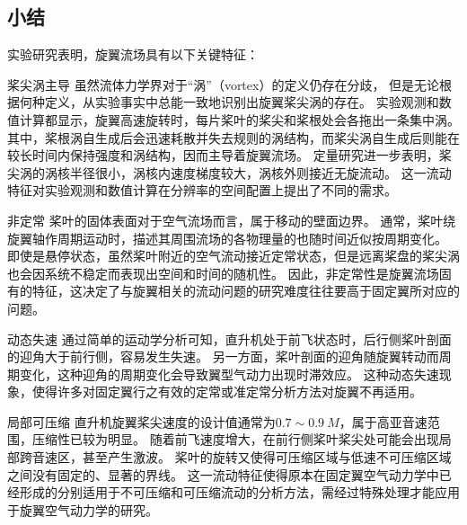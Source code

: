 \documentclass[doctor,openright,twoside,color]{buaathesis}
\begin{document}
\subsection{小结}
实验研究表明，旋翼流场具有以下关键特征：
\begin{compactdesc}
  \item[桨尖涡主导]
  虽然流体力学界对于“涡”（vortex）的定义仍存在分歧，%
  但是无论根据何种定义，从实验事实中总能一致地识别出旋翼桨尖涡的存在。
  实验观测和数值计算都显示，旋翼高速旋转时，每片桨叶的桨尖和桨根处会各拖出一条集中涡。
  其中，桨根涡自生成后会迅速耗散并失去规则的涡结构，而桨尖涡自生成后则能在较长时间内保持强度和涡结构，因而主导着旋翼流场。
  定量研究进一步表明，桨尖涡的涡核半径很小，涡核内速度梯度较大，涡核外则接近无旋流动。
  这一流动特征对实验观测和数值计算在分辨率的空间配置上提出了不同的需求。
  \item[非定常]
  桨叶的固体表面对于空气流场而言，属于移动的壁面边界。
  通常，桨叶绕旋翼轴作周期运动时，描述其周围流场的各物理量的也随时间近似按周期变化。
  即使是悬停状态，虽然桨叶附近的空气流动接近定常状态，但是远离桨盘的桨尖涡也会因系统不稳定而表现出空间和时间的随机性。
  因此，非定常性是旋翼流场固有的特征，这决定了与旋翼相关的流动问题的研究难度往往要高于固定翼所对应的问题。
  \item[动态失速]
  通过简单的运动学分析可知，直升机处于前飞状态时，后行侧桨叶剖面的迎角大于前行侧，容易发生失速。
  另一方面，桨叶剖面的迎角随旋翼转动而周期变化，这种迎角的周期变化会导致翼型气动力出现时滞效应。
  这种动态失速现象，使得许多对固定翼行之有效的定常或准定常分析方法对旋翼不再适用。
  \item[局部可压缩]
  直升机旋翼桨尖速度的设计值通常为$0.7\sim0.9~M$，属于高亚音速范围，压缩性已较为明显。
  随着前飞速度增大，在前行侧桨叶桨尖处可能会出现局部跨音速区，甚至产生激波。
  桨叶的旋转又使得可压缩区域与低速不可压缩区域之间没有固定的、显著的界线。
  这一流动特征使得原本在固定翼空气动力学中已经形成的分别适用于不可压缩和可压缩流动的分析方法，需经过特殊处理才能应用于旋翼空气动力学的研究。
\end{compactdesc}
\end{document}
